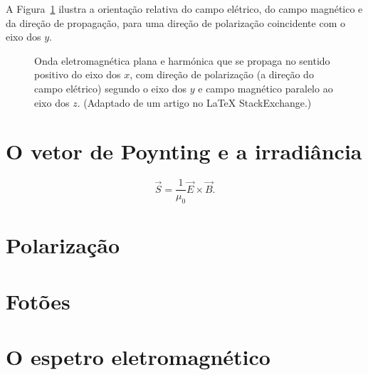 A Figura~\ref{fig:plemwave} ilustra a orientação relativa do campo elétrico, do
campo magnético e da direção de propagação, para uma direção de polarização
coincidente com o eixo dos $y$.
\begin{figure}[htb]
  {\centering
      \par
    }
    \caption{Onda eletromagnética plana e harmónica que se propaga no sentido
    positivo do eixo dos $x$, com direção de polarização (a direção do campo
  elétrico) segundo o eixo dos $y$ e campo magnético paralelo ao eixo dos $z$.
  (Adaptado de um artigo no \LaTeX{} StackExchange.)\label{fig:plemwave}}
\end{figure}

\section{O vetor de Poynting e a irradiância}
\begin{equation*}
  \vec S=\frac{1}{\mu_0}\vec E\times\vec B.
\end{equation*}
\tobedone{}

\section{Polarização}
\tobedone{}

\section{Fotões}
\tobedone{}

\section{O espetro eletromagnético}
\tobedone{}



